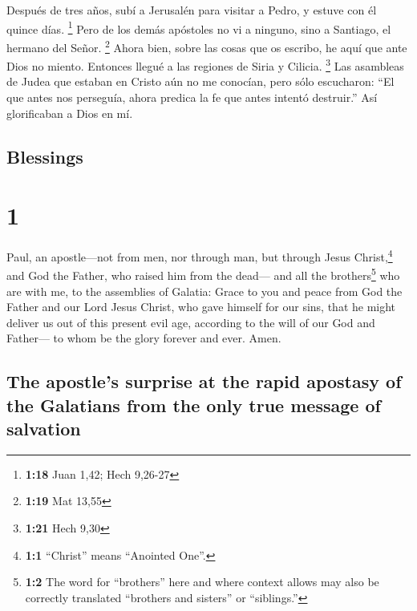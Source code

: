 \begin{paracol}{2}
 Después de tres años, subí a Jerusalén para visitar a
Pedro, y estuve con él quince días. \footnote{\textbf{1:18} Juan 1,42;
  Hech 9,26-27}  Pero de los demás apóstoles no vi a
ninguno, sino a Santiago, el hermano del Señor. \footnote{\textbf{1:19}
  Mat 13,55}  Ahora bien, sobre las cosas que os escribo,
he aquí que ante Dios no miento.  Entonces llegué a las
regiones de Siria y Cilicia. \footnote{\textbf{1:21} Hech 9,30}
 Las asambleas de Judea que estaban en Cristo aún no me
conocían,  pero sólo escucharon: ``El que antes nos
perseguía, ahora predica la fe que antes intentó destruir.''
 Así glorificaban a Dios en mí.

\switchcolumn
\begin{otherlanguage}{english}

\hypertarget{blessings}{%
\subsection{Blessings}\label{blessings}}

\hypertarget{section-1}{%
\section{1}\label{section-1}}

 Paul, an apostle---not from men, nor through man, but
through Jesus Christ,\footnote{\textbf{1:1} ``Christ'' means ``Anointed
  One''.} and God the Father, who raised him from the dead---
 and all the brothers\footnote{\textbf{1:2} The word for
  ``brothers'' here and where context allows may also be correctly
  translated ``brothers and sisters'' or ``siblings.''} who are with me,
to the assemblies of Galatia:  Grace to you and peace from
God the Father and our Lord Jesus Christ,  who gave
himself for our sins, that he might deliver us out of this present evil
age, according to the will of our God and Father---  to
whom be the glory forever and ever. Amen.

\hypertarget{the-apostles-surprise-at-the-rapid-apostasy-of-the-galatians-from-the-only-true-message-of-salvation}{%
\subsection{The apostle's surprise at the rapid apostasy of the
Galatians from the only true message of
salvation}\label{the-apostles-surprise-at-the-rapid-apostasy-of-the-galatians-from-the-only-true-message-of-salvation}}


\end{otherlanguage}
\end{paracol}
